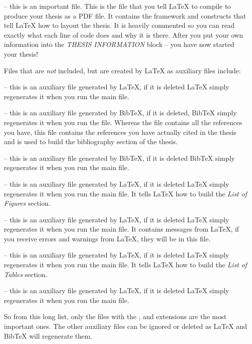  -- this is an important file. This is the file that you tell \LaTeX{} to compile to produce your thesis as a PDF file. It contains the framework and constructs that tell \LaTeX{} how to layout the thesis. It is heavily commented so you can read exactly what each line of code does and why it is there. After you put your own information into the \emph{THESIS INFORMATION} block -- you have now started your thesis!

Files that are \emph{not} included, but are created by \LaTeX{} as auxiliary files include:

 -- this is an auxiliary file generated by \LaTeX{}, if it is deleted \LaTeX{} simply regenerates it when you run the main  file.

 -- this is an auxiliary file generated by BibTeX, if it is deleted, BibTeX simply regenerates it when you run the  file. Whereas the  file contains all the references you have, this  file contains the references you have actually cited in the thesis and is used to build the bibliography section of the thesis.

 -- this is an auxiliary file generated by BibTeX, if it is deleted BibTeX simply regenerates it when you run the main  file.

 -- this is an auxiliary file generated by \LaTeX{}, if it is deleted \LaTeX{} simply regenerates it when you run the main  file. It tells \LaTeX{} how to build the \emph{List of Figures} section.

 -- this is an auxiliary file generated by \LaTeX{}, if it is deleted \LaTeX{} simply regenerates it when you run the main  file. It contains messages from \LaTeX{}, if you receive errors and warnings from \LaTeX{}, they will be in this  file.

 -- this is an auxiliary file generated by \LaTeX{}, if it is deleted \LaTeX{} simply regenerates it when you run the main  file. It tells \LaTeX{} how to build the \emph{List of Tables} section.

 -- this is an auxiliary file generated by \LaTeX{}, if it is deleted \LaTeX{} simply regenerates it when you run the main  file.

So from this long list, only the files with the ,  and  extensions are the most important ones. The other auxiliary files can be ignored or deleted as \LaTeX{} and BibTeX will regenerate them.

